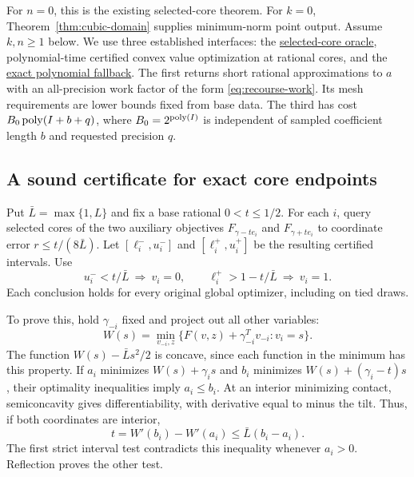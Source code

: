 For $n=0$, this is the existing selected-core theorem. For $k=0$,
Theorem~\ref{thm:cubic-domain} supplies minimum-norm point output.
Assume $k,n\ge1$ below. We use three established interfaces: the
\href{../../research-20261002/new-direction/core-only-noise-core-oracle.md}{selected-core oracle},
polynomial-time certified convex value optimization at rational cores,
and the
\href{../../research-20261002/new-direction/polynomial-exact-fallback.md}{exact polynomial fallback}.
The first returns short rational approximations to $a$ with an
all-precision work factor of the form \eqref{eq:recourse-work}. Its mesh
requirements are lower bounds fixed from base data. The third has
cost $B_0\operatorname{poly}(I+b+q)$, where $B_0=2^{\operatorname{poly}(I)}$ is independent of
sampled coefficient length $b$ and requested precision $q$.

\subsection{A sound certificate for exact core endpoints}

Put $\bar L=\max\{1,L\}$ and fix a base rational $0<t\le1/2$.
For each $i$, query selected cores of the two auxiliary objectives
$F_{\gamma-te_i}$ and $F_{\gamma+te_i}$ to coordinate error
$r\le t/(8\bar L)$. Let $[\ell_i^-,u_i^-]$ and
$[\ell_i^+,u_i^+]$ be the resulting certified intervals. Use
\begin{equation}
 u_i^-<t/\bar L\ \Longrightarrow\ v_i=0,
 \qquad
 \ell_i^+>1-t/\bar L\ \Longrightarrow\ v_i=1.
 \label{eq:recourse-face-test}
\end{equation}
Each conclusion holds for every original global optimizer, including
on tied draws.

To prove this, hold $\gamma_{-i}$ fixed and project out all other
variables:
\[
 W(s)=\min_{v_{-i},z}
       \{F(v,z)+\gamma_{-i}^Tv_{-i}:v_i=s\}.
\]
The function $W(s)-\bar Ls^2/2$ is concave, since each function in
the minimum has this property. If $a_i$ minimizes
$W(s)+\gamma_i s$ and $b_i$ minimizes
$W(s)+(\gamma_i-t)s$, their optimality inequalities imply
$a_i\le b_i$. At an interior minimizing contact, semiconcavity gives
differentiability, with derivative equal to minus the tilt. Thus, if
both coordinates are interior,
\[
 t=W'(b_i)-W'(a_i)\le\bar L(b_i-a_i).
\]
The first strict interval test contradicts this inequality whenever
$a_i>0$. Reflection proves the other test.

